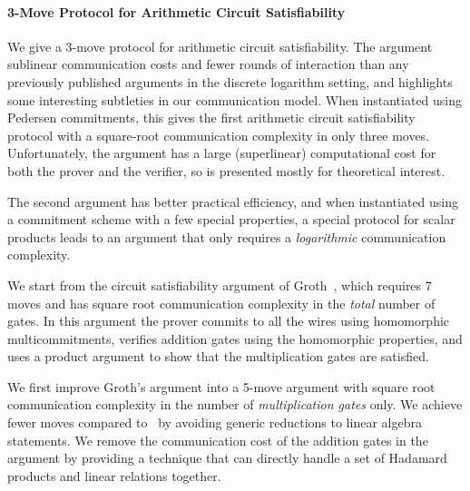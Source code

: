 \paragraph{3-Move Protocol for Arithmetic Circuit Satisfiability}

We give a 3-move protocol for arithmetic circuit satisfiability. The argument sublinear communication costs and fewer rounds of interaction than any previously published arguments in the discrete logarithm setting, and highlights some interesting subtleties in our communication model. When instantiated using Pedersen commitments, this gives the first arithmetic circuit satisfiability protocol with a square-root communication complexity in only three moves. Unfortunately, the argument has a large (superlinear) computational cost for both the prover and the verifier, so is presented mostly for theoretical interest.

The second argument has better practical efficiency, and when instantiated using a commitment scheme with a few special properties, a special protocol for scalar products leads to an argument that only requires a {\em logarithmic} communication complexity.

We start from the circuit satisfiability argument of Groth~\cite{Groth2009b}, which requires 7 moves and has square root communication complexity in the \emph{total} number of gates. In this argument the prover commits to all the wires using homomorphic multicommitments, verifies addition gates using the homomorphic properties, and uses a product argument to show that the multiplication gates are satisfied.

We first improve Groth's argument into a 5-move argument with square root communication complexity in the number of \emph{multiplication gates} only.
%
We achieve fewer moves compared to~\cite{Groth2009b} by avoiding generic reductions to linear algebra statements.
%
We remove the communication cost of the addition gates in the argument by providing a technique that can directly handle a set of Hadamard products and linear relations together.

